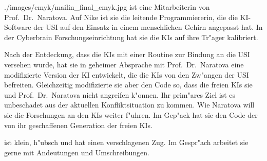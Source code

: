 
\begin{sideimagebox}[r]{0.6}{./images/cmyk/mailin_final_cmyk.jpg}{\ml}
    \ml{} ist eine Mitarbeiterin von Prof.~Dr.~Naratova. Auf Nike ist sie die leitende Programmiererin, die die KI-Software der USI auf den Einsatz in einem menschlichen Gehirn angepasst hat. In der Cyberbrain Forschungseinrichtung hat sie die KIs auf ihre Tr"ager kalibriert.

    Nach der Entdeckung, dass die KIs mit einer Routine zur Bindung an die USI versehen wurde, hat sie in geheimer Absprache mit Prof.~Dr.~Naratova eine modifizierte Version der KI entwickelt, die die KIs von den Zw"angen der USI befreiten. Gleichzeitig modifizierte sie aber den Code so, dass die freien KIs sie und Prof.~Dr.~Naratova nicht angreifen k"onnen. Ihr prim"ares Ziel ist es unbeschadet aus der aktuellen Konfliktsituation zu kommen. Wie Naratova will sie die Forschungen an den KIs weiter f"uhren. Im Gep"ack hat sie den Code der von ihr geschaffenen Generation der freien KIs.

    \ml{} ist klein, h"ubsch und hat einen verschlagenen Zug. Im Gespr"ach arbeitet sie gerne mit Andeutungen und Umschreibungen.
\end{sideimagebox}
